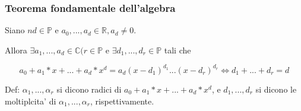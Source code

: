 \documentclass{article}
\begin{document}
        \subsubsection{Teorema fondamentale dell'algebra}
        \begin{flushleft}
          Siano $n d \in \mathbb{P}$ e $a_0,...,a_d \in \mathbb{R},a_d \neq 0$. 
        \end{flushleft}
        \begin{flushleft}
          Allora $\exists a_1,...,a_d \in \mathbb{C} (r \in \mathbb{P}$ e $\exists d_1,...,d_r \in \mathbb{P}$ tali che
        \end{flushleft}
        \begin{equation}
          a_0+a_1*x+...+a_d*x^d=a_d(x-d_1)^{d_1}...(x-d_r)^{d_r} \iff d_1+...+d_r =d
        \end{equation}
        \begin{flushleft}
          Def: $\alpha_1,...,\alpha_r$ si dicono radici di $a_0+a_1*x+...+a_d*x^d$, e $d_1,...,d_r$ si dicono le moltiplcita' di $\alpha_1,...,\alpha_r$,
          rispettivamente.
        \end{flushleft}
\end{document}
